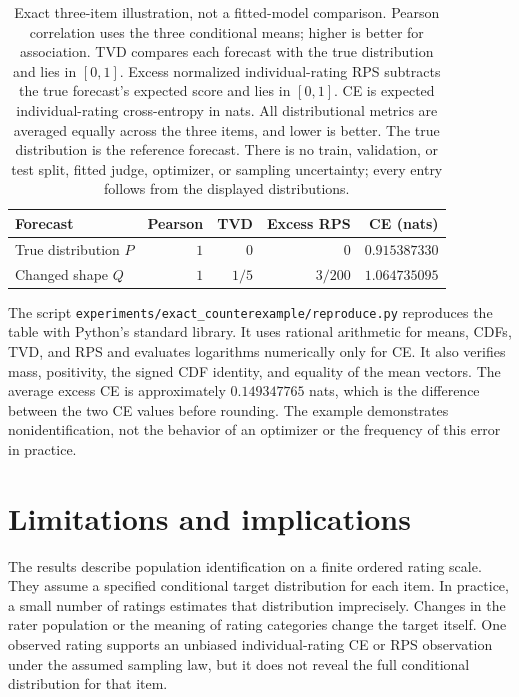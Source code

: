 \documentclass[11pt,letterpaper]{article}
\begin{document}
\begin{table}[ht]
\centering
\begin{tabular}{@{}lrrrr@{}}
\toprule
Forecast & Pearson & TVD & Excess RPS & CE (nats)\\
\midrule
True distribution $P$ & $1$ & $0$ & $0$ & $0.915387330$\\
Changed shape $Q$ & $1$ & $1/5$ & $3/200$ & $1.064735095$\\
\bottomrule
\end{tabular}
\caption{Exact three-item illustration, not a fitted-model comparison.
Pearson correlation uses the three conditional means; higher is better for association.
TVD compares each forecast with the true distribution and lies in $[0,1]$.
Excess normalized individual-rating RPS subtracts the true forecast's expected score and lies in $[0,1]$.
CE is expected individual-rating cross-entropy in nats.
All distributional metrics are averaged equally across the three items, and lower is better.
The true distribution is the reference forecast.
There is no train, validation, or test split, fitted judge, optimizer, or sampling uncertainty; every entry follows from the displayed distributions.}
\label{tab:exact}
\end{table}

The script \texttt{experiments/exact\_counterexample/reproduce.py} reproduces the table with Python's standard library.
It uses rational arithmetic for means, CDFs, TVD, and RPS and evaluates logarithms numerically only for CE.
It also verifies mass, positivity, the signed CDF identity, and equality of the mean vectors.
The average excess CE is approximately $0.149347765$ nats, which is the difference between the two CE values before rounding.
The example demonstrates nonidentification, not the behavior of an optimizer or the frequency of this error in practice.

\section{Limitations and implications}
The results describe population identification on a finite ordered rating scale.
They assume a specified conditional target distribution for each item.
In practice, a small number of ratings estimates that distribution imprecisely.
Changes in the rater population or the meaning of rating categories change the target itself.
One observed rating supports an unbiased individual-rating CE or RPS observation under the assumed sampling law, but it does not reveal the full conditional distribution for that item.
\end{document}
